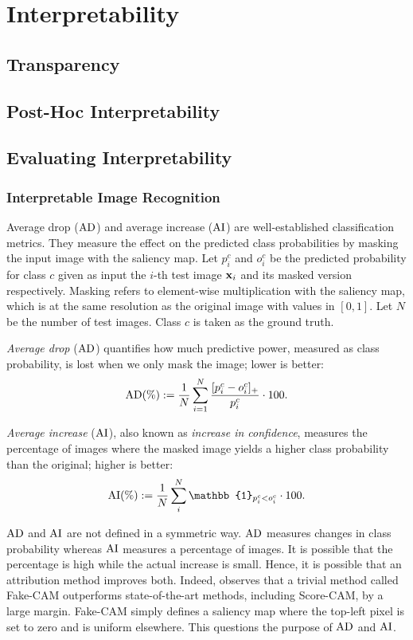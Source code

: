 \section*{Interpretability}
\label{rel:sec_int}

\subsection*{Transparency}
\label{rel:sub_transp}

\subsection*{Post-Hoc Interpretability}
\label{rel:sub_post}

\subsection*{Evaluating Interpretability}
\subsubsection*{Interpretable Image Recognition}
Average drop ($\operatorname{AD}$) and average increase ($\operatorname{AI}$) \cite{chattopadhay2018grad} are well-established classification metrics. 
They measure the effect on the predicted class probabilities by masking the input image with the saliency map. Let $p^c_i$ and $o^c_i$ 
be the predicted probability for class $c$ given as input the $i$-th test image $\mathbf{x}_i$ and its masked version respectively. 
Masking refers to element-wise multiplication with the saliency map, which is at the same resolution as the original image with values in $[0,1]$. 
Let $N$ be the number of test images. Class $c$ is taken as the ground truth.

\emph{Average drop} ($\operatorname{AD}$) quantifies how much predictive power, measured as class probability, is lost when we only mask the image; lower is better:
\begin{equation}
	\operatorname{AD}(\%) \mathrel{:=} \frac{1}{N} \sum_{i=1}^N \frac{[p^c_i - o^c_i]_+}{p^c_i} \cdot 100.
\label{eq:ad}
\end{equation}

\emph{Average increase} ($\operatorname{AI}$), also known as \emph{increase in confidence}, measures the percentage of images where the masked
 image yields a higher class probability than the original; higher is better:
\begin{equation}
	\AI(\%) \defn \frac{1}{N} \sum_i^N \mathbb{1}_{p^c_i < o^c_i} \cdot 100.
\label{eq:ai}
\end{equation}

$\operatorname{AD}$ and $\operatorname{AI}$ are not defined in a symmetric way. $\operatorname{AD}$ measures changes in class probability whereas $\operatorname{AI}$ measures a 
percentage of images. It is possible that the percentage is high while the actual increase is small. Hence, it is possible that an attribution method improves both. 
Indeed, \cite{poppi2021revisiting} observes that a trivial method called Fake-CAM outperforms state-of-the-art methods, including Score-CAM, 
by a large margin. Fake-CAM simply defines a saliency map where the top-left pixel is set to zero and is uniform elsewhere. This questions the purpose of $\operatorname{AD}$ and $\operatorname{AI}$.